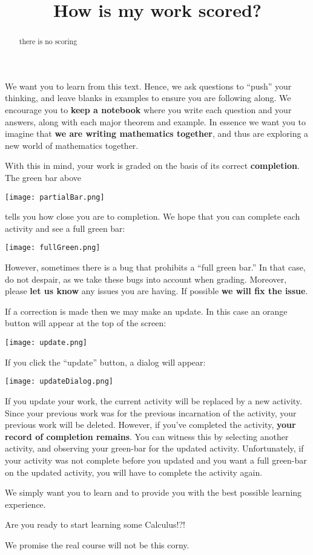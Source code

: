 \documentclass{ximera}
\title{How is my work scored?}
\begin{document}
\begin{abstract}
  there is no scoring
\end{abstract}
\maketitle

We want you to learn from this text. Hence, we ask questions to
``push'' your thinking, and leave blanks in examples to ensure you are
following along. We encourage you to \textbf{keep a notebook} where
you write each question and your answers, along with each major
theorem and example. In essence we want you to imagine that \textbf{we
  are writing mathematics together}, and thus are exploring a new
world of mathematics together.

With this in mind, your work is graded on the basis of its correct
\textbf{completion}. The green bar above
\begin{image}
  \texttt{[image: partialBar.png]}
\end{image}
tells you how close you are to completion. We hope that you can
complete each activity and see a full green bar:
\begin{image}
  \texttt{[image: fullGreen.png]}
\end{image}
However, sometimes there is a bug that prohibits a ``full green bar.''
In that case, do not despair, as we take these bugs into account when
grading. Moreover, please \textbf{let us know} any issues you are
having. If possible \textbf{we will fix the issue}.

If a correction is made then we may make an update. In this case an orange button will appear at the top of the screen:
\begin{image}
  \texttt{[image: update.png]}
\end{image}
If you click the ``update'' button, a dialog will appear:
\begin{image}
  \texttt{[image: updateDialog.png]}
\end{image}
If you update your work, the current activity will be replaced by a
new activity. Since your previous work was for the previous
incarnation of the activity, your previous work will be
deleted. However, if you've completed the activity, \textbf{your
  record of completion remains}. You can witness this by selecting
another activity, and observing your green-bar for the updated
activity.  Unfortunately, if your activity was not complete before you
updated and you want a full green-bar on the updated activity, you
will have to complete the activity again.


We simply want you to learn and to provide you with the best possible
learning experience.

\begin{problem}
  Are you ready to start learning some Calculus!?!
  \begin{multipleChoice}
  \end{multipleChoice}
  \begin{hint}
    We promise the real course will not be this corny.
  \end{hint}
\end{problem}
\end{document}
